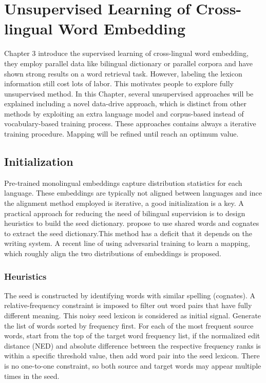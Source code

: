 \chapter{Unsupervised Learning of Cross-lingual Word Embedding}
Chapter 3 introduce the supervised learning of cross-lingual word embedding, they employ parallel data like bilingual dictionary or parallel corpora and  have shown strong results on a word retrieval task.  However, labeling the lexicon information still cost lots of labor. This motivates people to explore fully unsupervised method. In this Chapter, several unsupervised approaches will be explained including a novel data-drive approach, which is distinct from other methods by exploiting an extra language model and corpus-based instead of vocabulary-based training process. These approaches contains always a iterative training procedure. Mapping will be refined until reach an optimum value. 
\section{Initialization}
Pre-trained monolingual embeddings capture distribution statistics for each language. These embeddings are typically not aligned between languages and ince the alignment method employed is iterative, a good initialization is a key.
A practical approach for reducing the need of bilingual supervision is to design heuristics to build the seed dictionary. \cite{} propose to use shared words and cognates to extract the seed dictionary.This method has a deficit that it depends on the writing system.  A recent line of using adversarial training to learn a mapping, which roughly align the two distributions of embeddings is proposed.\\

\subsection{Heuristics}
The seed is constructed by identifying words with similar spelling (cognates). A relative-frequency constraint is imposed to filter out word pairs that have fully different meaning.  This noisy seed lexicon is considered as initial signal. Generate the list of words sorted by frequency first. For each of the most frequent source words, start from the top of the target word frequency list, if the normalized edit distance (NED) and absolute difference between the respective frequency ranks is within a specific threshold value, then add word pair into the seed lexicon. There is no one-to-one constraint, so both source and target words may appear multiple times in the seed. 

